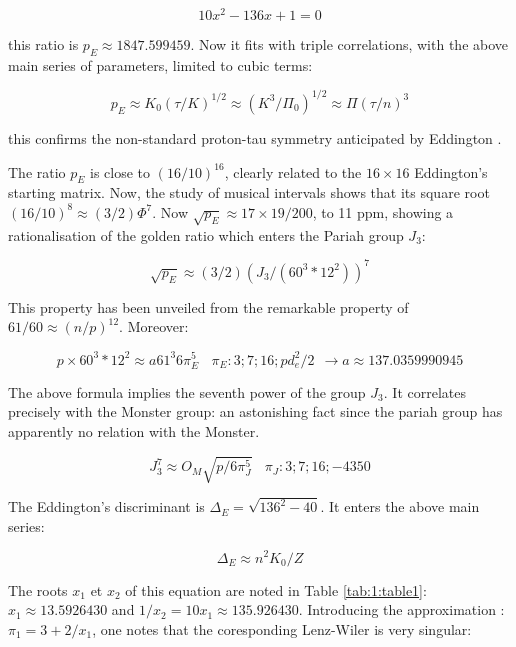 \documentclass[a4paper,9pt]{article}
\begin{document}
\begin{equation}
 10x^2 - 136x +1 = 0     
\end{equation}

this ratio is $p_E \approx 1847.599459$. Now it fits with triple correlations, with the above main series of parameters, limited to cubic terms:

\begin{equation}
 p_E \approx K_0 (\tau/K)^{1/2} \approx (K^3/\Pi_0)^{1/2}  \approx  \Pi (\tau/n)^3     
\end{equation}

this confirms the non-standard proton-tau symmetry anticipated by Eddington \cite{Sanchez}.

The ratio $p_E$  is close to $(16/10)^{16}$, clearly related to the $16 \times 16$ Eddington's starting matrix. Now, the study of musical intervals shows that its square root $(16/10)^8 \approx (3/2) \Phi^7$. Now $\sqrt {p_E} \approx 17 \times 19 / 200$, to 11 ppm, showing a rationalisation of the golden ratio which enters the Pariah group $J_3$:

\begin{equation}
 \sqrt {p_E} \approx (3/2) (J_3/(60^3*12^2))^7   
\end{equation}

This property has been unveiled from the remarkable property of $61/60 \approx (n/p)^{12}$. Moreover: 

\begin{equation}
 p \times 60^3*12^2 \approx a 61^3 6\pi_E^5~~~~ \pi_E : 3; 7; 16; pd_e^2/2 ~~ \rightarrow a\approx 137.0359990945    
\end{equation}

The above formula implies the seventh power of the group $J_3$. It correlates precisely with the Monster group: an astonishing fact since the pariah group has apparently no relation with the Monster.

\begin{equation}
J_3^7 \approx O_M \sqrt{p/6\pi_J^5}~~~~ \pi_J : 3; 7; 16; -4350    
\end{equation}

The Eddington's discriminant is $\Delta_E = \sqrt{136^2-40}$. It enters the above main series:

\begin{equation}
\Delta_E \approx n^2 K_0/Z    
\end{equation}


The roots $x_1$ et $x_2$ of this equation are noted in Table \ref{tab:1:table1}: $x_1 \approx 13.5926430$ and $1/x_2 = 10 x_1 \approx  135.926430$. Introducing the approximation : $\pi_1 = 3+2/x_1$, one notes that the coresponding Lenz-Wiler is very singular:
\end{document}
